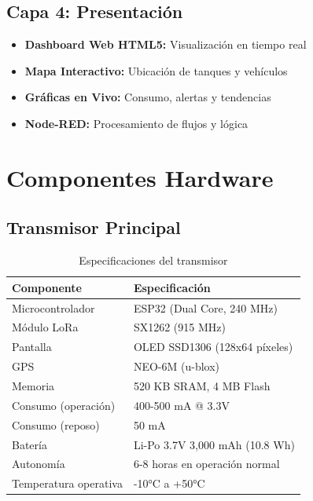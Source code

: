 \documentclass[12pt,a4paper,oneside]{report}
\begin{document}
\subsection{Capa 4: Presentación}

\begin{itemize}
    \item \textbf{Dashboard Web HTML5:} Visualización en tiempo real
    \item \textbf{Mapa Interactivo:} Ubicación de tanques y vehículos
    \item \textbf{Gráficas en Vivo:} Consumo, alertas y tendencias
    \item \textbf{Node-RED:} Procesamiento de flujos y lógica
\end{itemize}

\section{Componentes Hardware}

\subsection{Transmisor Principal}

\begin{table}[H]
    \centering
    \begin{tabular}{|l|l|}
        \hline
        \textbf{Componente} & \textbf{Especificación} \\
        \hline
        Microcontrolador & ESP32 (Dual Core, 240 MHz) \\
        Módulo LoRa & SX1262 (915 MHz) \\
        Pantalla & OLED SSD1306 (128x64 píxeles) \\
        GPS & NEO-6M (u-blox) \\
        Memoria & 520 KB SRAM, 4 MB Flash \\
        Consumo (operación) & 400-500 mA @ 3.3V \\
        Consumo (reposo) & 50 mA \\
        Batería & Li-Po 3.7V 3,000 mAh (10.8 Wh) \\
        Autonomía & 6-8 horas en operación normal \\
        Temperatura operativa & -10°C a +50°C \\
        \hline
    \end{tabular}
    \caption{Especificaciones del transmisor}
\end{table}
\end{document}
